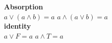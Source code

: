 \textbf{Absorption}\\
$a \lor (a \land b) = a$ \hfill $a \land (a \lor b) = a$ \\

\textbf{identity}\\
$a \lor F = a$ \hfill $a \land T = a$
